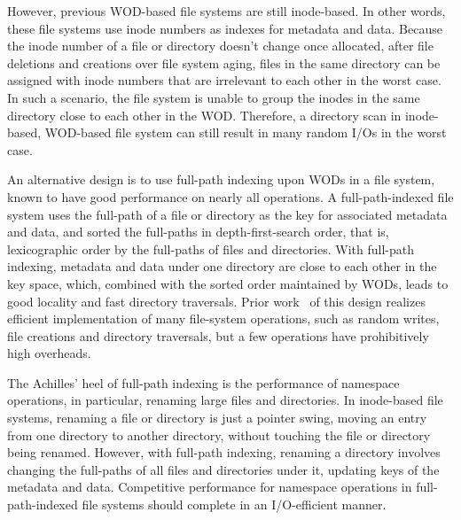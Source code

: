 However, previous WOD-based file systems are still inode-based.
In other words, these file systems use inode numbers as indexes for
metadata and data.
Because the inode number of a file or directory doesn't change once allocated,
after file deletions and creations over file system aging,
files in the same directory can be assigned with inode numbers that are
irrelevant to each other in the worst case.
In such a scenario, the file system is unable to group the inodes in the
same directory close to each other in the WOD.
Therefore, a directory scan in inode-based, WOD-based file system can still
result in many random I/Os in the worst case.

An alternative design is to use full-path indexing upon WODs in a file system,
known to have good performance on nearly all operations.
A full-path-indexed file system uses the full-path of a file or directory as
the key for associated metadata and data,
and sorted the full-paths in depth-first-search order,
that is, lexicographic order by the full-paths of files and directories.
With full-path indexing, metadata and data under one directory are close to each
other in the key space, which, combined with the sorted order maintained by
WODs, leads to good locality and fast directory traversals.
Prior work~\citep{betrfs1,betrfs1tos,betrfs2,betrfs2tos,betrfs3} of this design
realizes efficient implementation of many file-system operations, such as random
writes, file creations and directory traversals,
but a few operations have prohibitively high overheads.

The Achilles' heel of full-path indexing is the performance of namespace
operations, in particular, renaming large files and directories.
In inode-based file systems,
renaming a file or directory is just a pointer swing,
moving an entry from one directory to another directory,
without touching the file or directory being renamed.
However, with full-path indexing, renaming a directory involves changing the
full-paths of all files and directories under it,
updating keys of the metadata and data.
Competitive performance for namespace operations in full-path-indexed file
systems should complete in an I/O-efficient manner.

